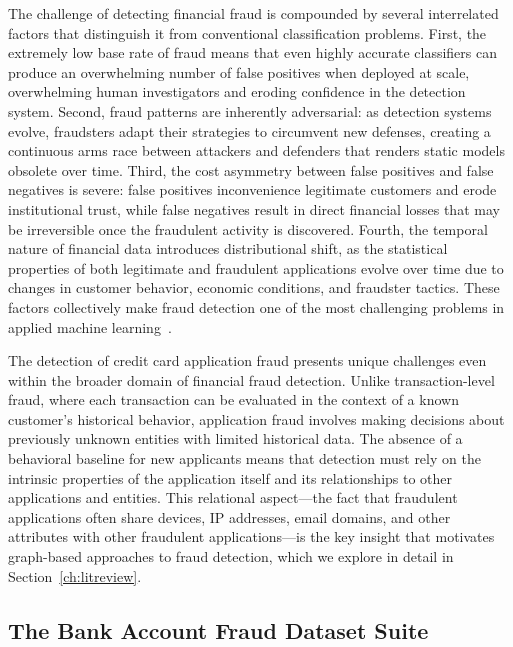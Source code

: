The challenge of detecting financial fraud is compounded by several interrelated
factors that distinguish it from conventional classification problems. First,
the extremely low base rate of fraud means that even highly accurate classifiers
can produce an overwhelming number of false positives when deployed at scale,
overwhelming human investigators and eroding confidence in the detection system.
Second, fraud patterns are inherently adversarial: as detection systems evolve,
fraudsters adapt their strategies to circumvent new defenses, creating a
continuous arms race between attackers and defenders that renders static models
obsolete over time. Third, the cost asymmetry between false positives and false
negatives is severe: false positives inconvenience legitimate customers and
erode institutional trust, while false negatives result in direct financial
losses that may be irreversible once the fraudulent activity is discovered.
Fourth, the temporal nature of financial data introduces distributional shift,
as the statistical properties of both legitimate and fraudulent applications
evolve over time due to changes in customer behavior, economic conditions, and
fraudster tactics. These factors collectively make fraud detection one of the
most challenging problems in applied machine learning~\cite{alenzi2020fraud}.

The detection of credit card application fraud presents unique challenges even
within the broader domain of financial fraud detection. Unlike transaction-level
fraud, where each transaction can be evaluated in the context of a known
customer's historical behavior, application fraud involves making decisions
about previously unknown entities with limited historical data. The absence of a
behavioral baseline for new applicants means that detection must rely on the
intrinsic properties of the application itself and its relationships to other
applications and entities. This relational aspect---the fact that fraudulent
applications often share devices, IP addresses, email domains, and other
attributes with other fraudulent applications---is the key insight that
motivates graph-based approaches to fraud detection, which we explore in detail
in Section~\ref{ch:litreview}.

\subsection{The Bank Account Fraud Dataset Suite}

